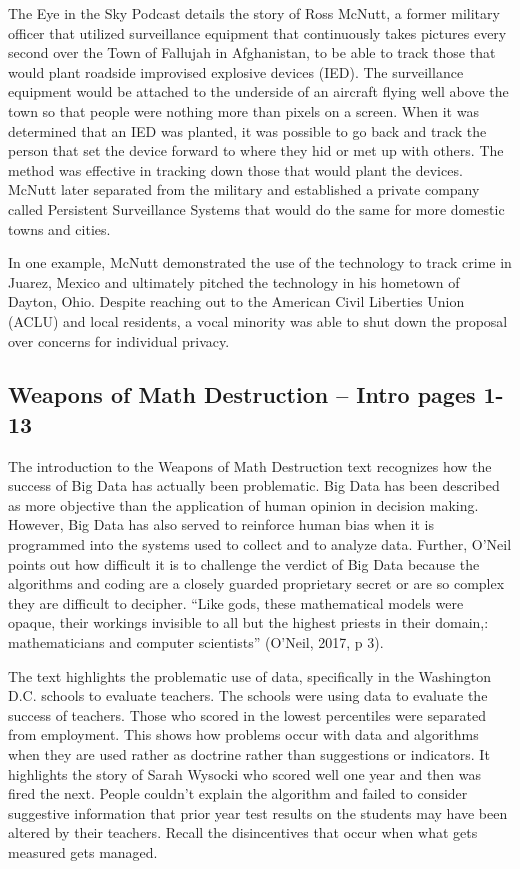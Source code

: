 \documentclass[]{book}
\theoremstyle{definition}
\theoremstyle{definition}
\theoremstyle{definition}
\theoremstyle{remark}
\begin{document}
The Eye in the Sky Podcast details the story of Ross McNutt, a former
military officer that utilized surveillance equipment that continuously
takes pictures every second over the Town of Fallujah in Afghanistan, to
be able to track those that would plant roadside improvised explosive
devices (IED). The surveillance equipment would be attached to the
underside of an aircraft flying well above the town so that people were
nothing more than pixels on a screen. When it was determined that an IED
was planted, it was possible to go back and track the person that set
the device forward to where they hid or met up with others. The method
was effective in tracking down those that would plant the devices.
McNutt later separated from the military and established a private
company called Persistent Surveillance Systems that would do the same
for more domestic towns and cities.

In one example, McNutt demonstrated the use of the technology to track
crime in Juarez, Mexico and ultimately pitched the technology in his
hometown of Dayton, Ohio. Despite reaching out to the American Civil
Liberties Union (ACLU) and local residents, a vocal minority was able to
shut down the proposal over concerns for individual privacy.

\hypertarget{weapons-of-math-destruction-intro-pages-1-13}{%
\subsection{Weapons of Math Destruction -- Intro pages
1-13}\label{weapons-of-math-destruction-intro-pages-1-13}}

The introduction to the Weapons of Math Destruction text recognizes how
the success of Big Data has actually been problematic. Big Data has been
described as more objective than the application of human opinion in
decision making. However, Big Data has also served to reinforce human
bias when it is programmed into the systems used to collect and to
analyze data. Further, O'Neil points out how difficult it is to
challenge the verdict of Big Data because the algorithms and coding are
a closely guarded proprietary secret or are so complex they are
difficult to decipher. ``Like gods, these mathematical models were
opaque, their workings invisible to all but the highest priests in their
domain,: mathematicians and computer scientists'' (O'Neil, 2017, p 3).

The text highlights the problematic use of data, specifically in the
Washington D.C. schools to evaluate teachers. The schools were using
data to evaluate the success of teachers. Those who scored in the lowest
percentiles were separated from employment. This shows how problems
occur with data and algorithms when they are used rather as doctrine
rather than suggestions or indicators. It highlights the story of Sarah
Wysocki who scored well one year and then was fired the next. People
couldn't explain the algorithm and failed to consider suggestive
information that prior year test results on the students may have been
altered by their teachers. Recall the disincentives that occur when what
gets measured gets managed.
\end{document}
